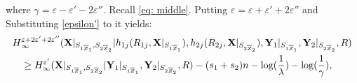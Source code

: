 \documentclass[runningheads]{llncs}
\begin{document}
where $\gamma = \varepsilon - \varepsilon' - 2\varepsilon''$. Recall \eqref{eq: middle}. Putting $\varepsilon = \varepsilon + \varepsilon' + 2\varepsilon''$ and Substituting \eqref{epsilon'} to it yields:
\begin{align}\label{epsilon''}
    H&^{\varepsilon+2\varepsilon'+2\varepsilon''}_{\infty}(\mathbf{X}|_{S_{1\overline{Z}_1},S_{2\overline{Z}_2}}|h_{1j}(R_{1j}, \mathbf{X}|_{S_{1\overline{Z}_1}}), h_{2j}(R_{2j}, \mathbf{X}|_{S_{2\overline{Z}_2}}), \mathbf{Y}_1|_{S_{1\overline{Z}_1}},\mathbf{Y}_2|_{S_{2\overline{Z}_2}}, R)\notag\\
    & \geq H^{\varepsilon'}_{\infty}(\mathbf{X}|_{S_{1\overline{Z}_1},S_{2\overline{Z}_2}}| \mathbf{Y}_1|_{S_{1\overline{Z}_1}},\mathbf{Y}_2|_{S_{2\overline{Z}_2}}, R) -(s_1+s_2)n - \log(\frac{1}{\lambda}) - \log(\frac{1}{\gamma}),
\end{align}
\end{document}
